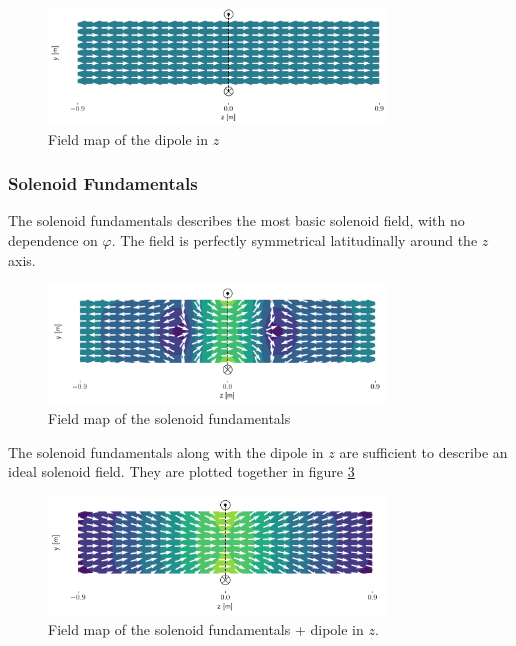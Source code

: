 \begin{figure}[h]
    \label{fig:zdip}
    \centering
    \includegraphics[width=0.8\textwidth]{figs/zdip.png}
    \caption{Field map of the dipole in $z$}
\end{figure}

\subsubsection{Solenoid Fundamentals}
The solenoid fundamentals describes the most basic solenoid
field, with no dependence on $\varphi$. The field is
perfectly symmetrical latitudinally around the $z$ axis.

\begin{figure}
    \centering
    \includegraphics[width=0.8\textwidth]{figs/solfun.png}
    \caption{Field map of the solenoid fundamentals}
    \label{fig:solfun}
\end{figure}

The solenoid fundamentals along with the dipole in $z$ are
sufficient to describe an ideal solenoid field. They are
plotted together in figure \ref{fig:solfundip}

\begin{figure}
    \centering
    \includegraphics[width=0.8\textwidth]{figs/solfundip.png}
    \caption{Field map of the solenoid fundamentals + 
    dipole in $z$.}
    \label{fig:solfundip}
\end{figure}

